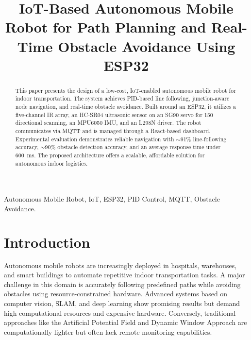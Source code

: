 \documentclass[conference]{IEEEtran}
\begin{document}
\title{IoT-Based Autonomous Mobile Robot for Path Planning and Real-Time Obstacle Avoidance Using ESP32}

\author{
}

\maketitle

\begin{abstract}
This paper presents the design of a low-cost, IoT-enabled autonomous mobile robot for indoor transportation. The system achieves PID-based line following, junction-aware node navigation, and real-time obstacle avoidance. Built around an ESP32, it utilizes a five-channel IR array, an HC-SR04 ultrasonic sensor on an SG90 servo for 150\textdegree{} directional scanning, an MPU6050 IMU, and an L298N driver. The robot communicates via MQTT and is managed through a React-based dashboard. Experimental evaluation demonstrates reliable navigation with $\sim$91\% line-following accuracy, $\sim$90\% obstacle detection accuracy, and an average response time under 600~ms. The proposed architecture offers a scalable, affordable solution for autonomous indoor logistics.
\end{abstract}

\begin{IEEEkeywords}
Autonomous Mobile Robot, IoT, ESP32, PID Control, MQTT, Obstacle Avoidance.
\end{IEEEkeywords}

\section{Introduction}
Autonomous mobile robots are increasingly deployed in hospitals, warehouses, and smart buildings to automate repetitive indoor transportation tasks. A major challenge in this domain is accurately following predefined paths while avoiding obstacles using resource-constrained hardware. Advanced systems based on computer vision, SLAM, and deep learning \cite{ref2,ref6,ref8} show promising results but demand high computational resources and expensive hardware. Conversely, traditional approaches like the Artificial Potential Field \cite{ref9} and Dynamic Window Approach \cite{ref5} are computationally lighter but often lack remote monitoring capabilities.
\end{document}
